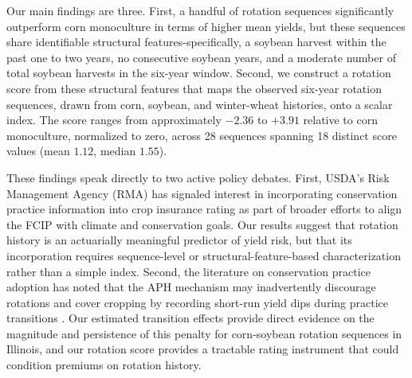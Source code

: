 \documentclass[12pt,letterpaper]{article}
\theoremstyle{remark}
\theoremstyle{remark}
\theoremstyle{plain}
\theoremstyle{definition}
\begin{document}
Our main findings are three. First, a handful of rotation sequences significantly outperform corn monoculture in terms of higher mean yields, but these sequences share identifiable structural features-specifically, a soybean harvest within the past one to two years, no consecutive soybean years, and a moderate number of total soybean harvests in the six-year window. Second, we construct a rotation score from these structural features that maps the observed six-year rotation sequences, drawn from corn, soybean, and winter-wheat histories, onto a scalar index. The score ranges from approximately $-2.36$ to $+3.91$ relative to corn monoculture, normalized to zero, across 28 sequences spanning 18 distinct score values (mean $1.12$, median $1.55$). %

 
These findings speak directly to two active policy debates. First, USDA's Risk Management Agency (RMA) has signaled interest in incorporating conservation practice information into crop insurance rating as part of broader efforts to align the FCIP with climate and conservation goals. Our results suggest that rotation history is an actuarially meaningful predictor of yield risk, but that its incorporation requires sequence-level or structural-feature-based characterization rather than a simple index. Second, the literature on conservation practice adoption has noted that the APH mechanism may inadvertently discourage rotations and cover cropping by recording short-run yield dips during practice transitions \citep{Connor2022}. Our estimated transition effects provide direct evidence on the magnitude and persistence of this penalty for corn-soybean rotation sequences in Illinois, and our rotation score provides a tractable rating instrument that could condition premiums on rotation history.
 
\end{document}
